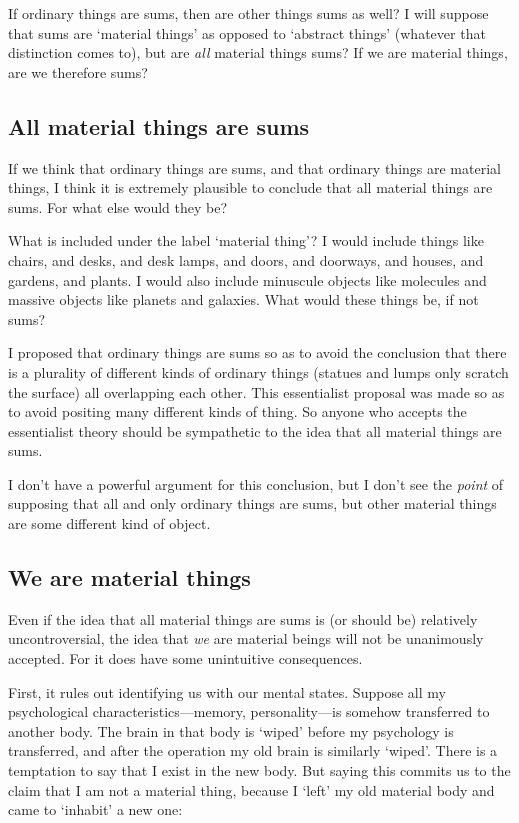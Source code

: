 \documentclass[11pt]{article}
\begin{document}
\begin{spacing}{1.5}
If ordinary things are sums, then are other things sums as well?  I
will suppose that sums are `material things' as opposed to `abstract
things' (whatever that distinction comes to), but are {\em all}
material things sums?  If we are material things, are we therefore
sums?


\subsection{All material things are sums}
\label{material-sum}
If we think that ordinary things are sums, and that ordinary things
are material things, I think it is extremely plausible to conclude
that all material things are sums.  For what else would they be?

What is included under the label `material thing'?  I would include
things like chairs, and desks, and desk lamps, and doors, and
doorways, and houses, and gardens, and plants.  I would also include
minuscule objects like molecules and massive objects like planets and
galaxies.  What would these things be, if not sums?

I proposed that ordinary things are sums so as to avoid the conclusion
that there is a plurality of different kinds of ordinary things
(statues and lumps only scratch the surface) all overlapping each
other.  This essentialist proposal was made so as to avoid positing
many different kinds of thing.  So anyone who accepts the essentialist
theory should be sympathetic to the idea that all material things are
sums.

I don't have a powerful argument for this conclusion, but I don't see
the {\em point} of supposing that all and only ordinary things are
sums, but other material things are some different kind of object.


\subsection{We are material things}
\label{material-beings}
Even if the idea that all material things are sums is (or should be)
relatively uncontroversial, the idea that {\em we} are material beings
will not be unanimously accepted.  For it does have some unintuitive
consequences.  

First, it rules out identifying us with our mental states.  Suppose
all my psychological characteristics---memory, personality---is
somehow transferred to another body.  The brain in that body is
`wiped' before my psychology is transferred, and after the operation
my old brain is similarly `wiped'.  There is a temptation to say that
I exist in the new body.  But saying this commits us to the claim that
I am not a material thing, because I `left' my old material body and
came to `inhabit' a new one:


\end{spacing}
\end{document}

